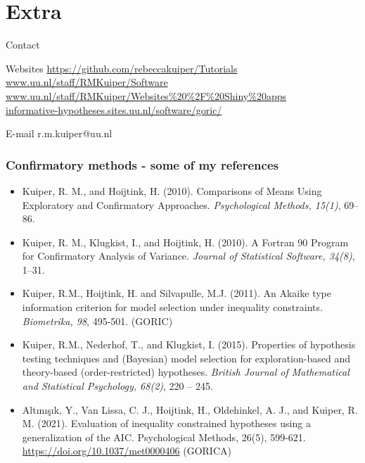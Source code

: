\documentclass[10pt]{beamer}\usepackage[]{graphicx}\usepackage[]{xcolor}
\begin{document}
\section{Extra} 
%
%
\begin{frame}{Contact}

\begin{block}{Websites}
\url{https://github.com/rebeccakuiper/Tutorials}
\url{www.uu.nl/staff/RMKuiper/Software}\\
\url{www.uu.nl/staff/RMKuiper/Websites\%20\%2F\%20Shiny\%20apps}\\
\url{informative-hypotheses.sites.uu.nl/software/goric/}
\end{block}

\begin{block}{E-mail}
r.m.kuiper@uu.nl
\end{block}

\end{frame}
%
\begin{frame}
	\frametitle{Confirmatory methods - some of my references}
	
	\footnotesize{
		\begin{itemize}
			\item Kuiper, R. M., and Hoijtink, H. (2010). Comparisons of Means Using Exploratory and Confirmatory Approaches. \emph{Psychological Methods, 15(1)}, 69--86.\\
			\item Kuiper, R. M., Klugkist, I., and Hoijtink, H. (2010). A Fortran 90 Program for Confirmatory Analysis of Variance. \emph{Journal of Statistical Software, 34(8)}, 1--31.\\
			\item Kuiper, R.M., Hoijtink, H. and Silvapulle, M.J. (2011). An Akaike type information criterion for model selection under inequality constraints. \emph{Biometrika, 98}, 495-501. (GORIC)\\
			\item Kuiper, R.M., Nederhof, T., and Klugkist, I. (2015). Properties of hypothesis testing techniques and (Bayesian) model selection for exploration-based and theory-based (order-restricted) hypotheses. \emph{British Journal of Mathematical and Statistical Psychology, 68(2)}, 220 -- 245. \\
			\item 	Alt{\i}n{\i}\c{s}{\i}k, Y., Van Lissa, C. J., Hoijtink, H., Oldehinkel, A. J., and Kuiper, R. M. (2021). Evaluation of inequality constrained hypotheses using a generalization of the AIC. Psychological Methods, 26(5), 599-621. \url{https://doi.org/10.1037/met0000406} (GORICA)
		\end{itemize}
	}
\end{frame}
\end{document}
